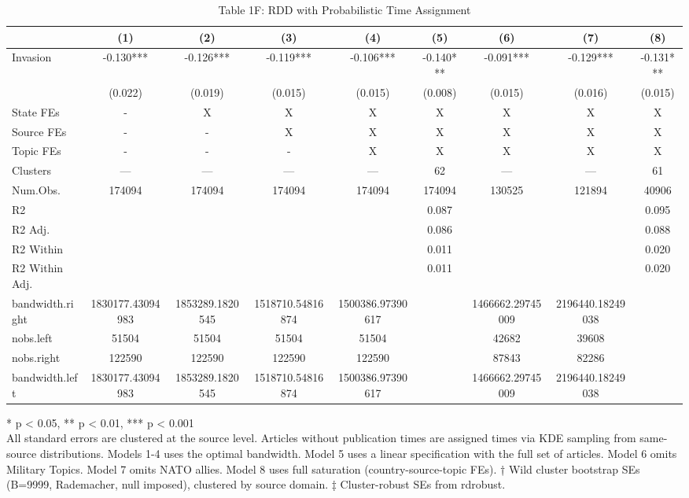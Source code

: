\begin{table}[!t]
\caption{Table 1F: RDD with Probabilistic Time Assignment} 
\fontsize{12.0pt}{14.4pt}\selectfont
\begin{tabular*}{\linewidth}{@{\extracolsep{\fill}}lcccccccc}
\toprule
  & (1) & (2) & (3) & (4) & (5) & (6) & (7) & (8) \\ 
\midrule\addlinespace[2.5pt]
Invasion & -0.130*** & -0.126*** & -0.119*** & -0.106*** & -0.140*** & -0.091*** & -0.129*** & -0.131*** \\ 
{} & {(0.022)} & {(0.019)} & {(0.015)} & {(0.015)} & {(0.008)} & {(0.015)} & {(0.016)} & {(0.015)} \\ 
State FEs & - & X & X & X & X & X & X & X \\ 
Source FEs & - & - & X & X & X & X & X & X \\ 
Topic FEs & - & - & - & X & X & X & X & X \\ 
Clusters & — & — & — & — & 62 & — & — & 61 \\ 
Num.Obs. & 174094 & 174094 & 174094 & 174094 & 174094 & 130525 & 121894 & 40906 \\ 
R2 &  &  &  &  & 0.087 &  &  & 0.095 \\ 
R2 Adj. &  &  &  &  & 0.086 &  &  & 0.088 \\ 
R2 Within &  &  &  &  & 0.011 &  &  & 0.020 \\ 
R2 Within Adj. &  &  &  &  & 0.011 &  &  & 0.020 \\ 
bandwidth.right & 1830177.43094983 & 1853289.1820545 & 1518710.54816874 & 1500386.97390617 &  & 1466662.29745009 & 2196440.18249038 &  \\ 
nobs.left & 51504 & 51504 & 51504 & 51504 &  & 42682 & 39608 &  \\ 
nobs.right & 122590 & 122590 & 122590 & 122590 &  & 87843 & 82286 &  \\ 
bandwidth.left & 1830177.43094983 & 1853289.1820545 & 1518710.54816874 & 1500386.97390617 &  & 1466662.29745009 & 2196440.18249038 &  \\ 
\bottomrule
\end{tabular*}
\begin{minipage}{\linewidth}
* p < 0.05, ** p < 0.01, *** p < 0.001\\
All standard errors are clustered at the source level. Articles without
publication times are assigned times via KDE sampling from same-source
distributions. Models 1-4 uses the optimal bandwidth. Model 5 uses a linear
specification with the full set of articles. Model 6 omits Military Topics.
Model 7 omits NATO allies. Model 8 uses full saturation (country-source-topic
FEs). † Wild cluster bootstrap SEs (B=9999, Rademacher, null imposed), clustered
by source domain. ‡ Cluster-robust SEs from rdrobust.\\
\end{minipage}
\end{table}

